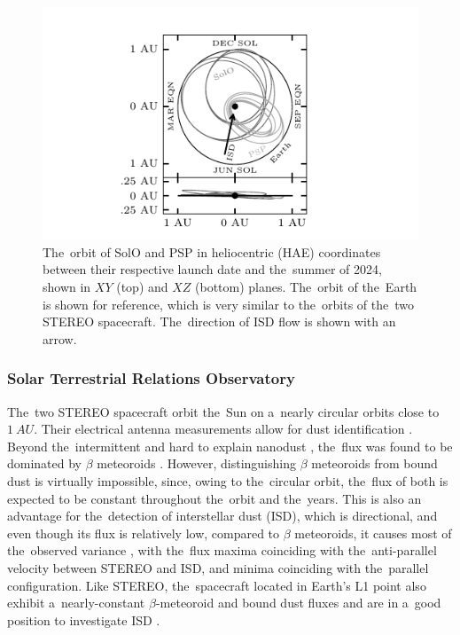 \begin{figure}[hb]
 	\centering
 	\includegraphics[width=13cm]{figures/solo_orbit.pdf}
 	\caption{The~orbit of SolO and PSP in heliocentric (HAE) coordinates between their respective launch date and the~summer of 2024, shown in $XY$ (top) and $XZ$ (bottom) planes. The~orbit of the~Earth is shown for reference, which is very similar to the~orbits of the~two STEREO spacecraft. The~direction of ISD flow is shown with an arrow.}
 	\label{fig:sc_orbits}
\end{figure}

\subsubsection{Solar Terrestrial Relations Observatory}

The~two STEREO spacecraft orbit the~Sun on a~nearly circular orbits close to $\SI{1}{AU}$. Their electrical antenna measurements allow for dust identification \citep{meyer2009dust}. Beyond the~intermittent and hard to explain nanodust \citep{meyer2009dust}, the~flux was found to be dominated by $\beta$ meteoroids \citep{zaslavsky2012interplanetary}. However, distinguishing $\beta$ meteoroids from bound dust is virtually impossible, since, owing to the~circular orbit, the~flux of both is expected to be constant throughout the~orbit and the~years. This is also an advantage for the~detection of interstellar dust (ISD), which is directional, and even though its flux is relatively low, compared to $\beta$ meteoroids, it causes most of the~observed variance \citep{zaslavsky2012interplanetary,malaspina2015revisiting,babic2022situ}, with the~flux maxima coinciding with the~anti-parallel velocity between STEREO and ISD, and minima coinciding with the~parallel configuration. Like STEREO, the~spacecraft located in Earth's L1 point also exhibit a~nearly-constant $\beta$-meteoroid and bound dust fluxes and are in a~good position to investigate ISD \citep{malaspina2014interplanetary,malaspina2016database}.


